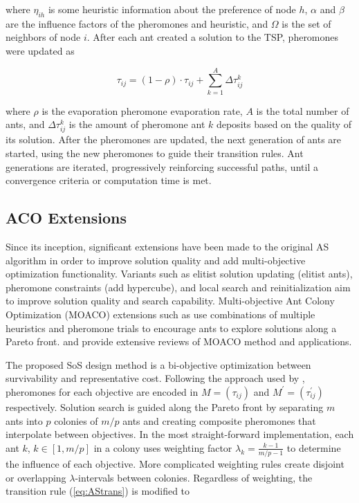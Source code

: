 \documentclass[preprint,12pt]{elsarticle}
\begin{document}
\noindent where $\eta_{ih}$ is some heuristic information about the preference of node $h$, $\alpha$ and $\beta$ are the influence factors of the pheromones and heuristic, and $\Omega$ is the set of neighbors of node $i$. After each ant created a solution to the TSP, pheromones were updated as

\begin{equation}
\tau_{ij}=(1-\rho)\cdot\tau_{ij}+\sum_{k=1}^{A}
\Delta\tau_{ij}^k
\label{eq:ASup}
\end{equation}

\noindent where $\rho$ is the evaporation pheromone evaporation rate, $A$ is the total number of ants, and $\Delta\tau_{ij}^k$ is the amount of pheromone ant $k$ deposits based on the quality of its solution. After the pheromones are updated, the next generation of ants are started, using the new pheromones to guide their transition rules. Ant generations are iterated, progressively reinforcing successful paths, until a convergence criteria or computation time is met.

\subsection{ACO Extensions}

Since its inception, significant extensions have been made to the original AS algorithm in order to improve solution quality and add multi-objective optimization functionality. Variants such as elitist solution updating (elitist ants), pheromone constraints \citep{Stutzle2000}(add hypercube), and local search and reinitialization \citep{Ashraf2013} aim to improve solution quality and search capability. Multi-objective Ant Colony Optimization (MOACO) extensions such as \citep{Angus2009,Iredi2001} use combinations of multiple heuristics and pheromone trials to encourage ants to explore solutions along a Pareto front. \cite{Garcia-Martinez2007} and \cite{Rada-Vilela2013} provide extensive reviews of MOACO method and applications. 

The proposed SoS design method is a bi-objective optimization between survivability and representative cost. Following the approach used by \cite{Iredi2001}, pheromones for each objective are encoded in $M=(\tau_{ij})$ and $M^{'}=(\tau_{ij}^{'})$ respectively. Solution search is guided along the Pareto front by separating $m$ ants into $p$ colonies of $m/p$ ants and creating composite pheromones that interpolate between objectives. In the most straight-forward implementation, each ant $k$, $k \in [1,m/p]$ in a colony uses weighting factor $\lambda_{k}=\frac{k-1}{m/p-1}$ to determine the influence of each objective. More complicated weighting rules create disjoint or overlapping $\lambda$-intervals between colonies. Regardless of weighting, the transition rule (\ref{eq:AStrans}) is modified to
\end{document}
